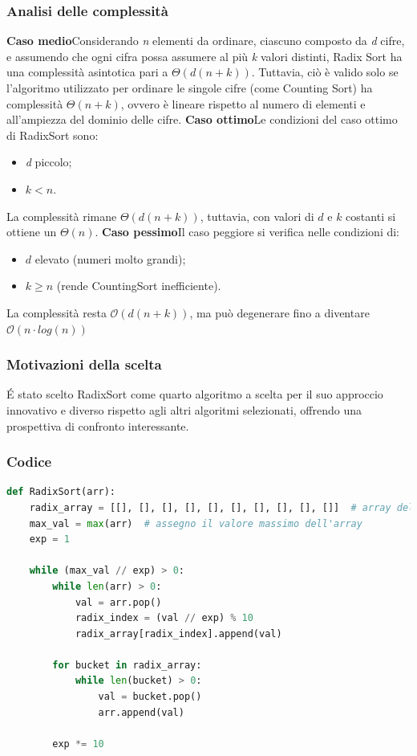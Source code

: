 \documentclass[a4paper, 11pt]{article}
\begin{document}
\subsubsection{Analisi delle complessità}
\textbf{Caso medio}\quad Considerando \textit{n} elementi da ordinare, ciascuno composto da \textit{d} cifre, e assumendo che ogni cifra possa assumere al più \textit{k} valori distinti, Radix Sort ha una complessità asintotica pari a $\Theta(d(n + k))$.\bigbreak
\noindent Tuttavia, ciò è valido solo se l'algoritmo utilizzato per ordinare le singole cifre (come Counting Sort) ha complessità $\Theta(n + k)$, ovvero è lineare rispetto al numero di elementi e all'ampiezza del dominio delle cifre.\bigbreak
\noindent \textbf{Caso ottimo}\quad Le condizioni del caso ottimo di RadixSort sono:
\begin{itemize}
    \item \textit{d} piccolo;
    \item $k < n$.
\end{itemize}
La complessità rimane $\Theta(d(n + k))$, tuttavia, con valori di $d$ e $k$ costanti si ottiene un $\Theta(n)$.\bigbreak
\noindent \textbf{Caso pessimo}\quad Il caso peggiore si verifica nelle condizioni di:
\begin{itemize}
    \item $d$ elevato (numeri molto grandi);
    \item $k \geq n$ (rende CountingSort inefficiente).
\end{itemize}
La complessità resta $\mathcal{O}(d(n + k))$, ma può degenerare fino a diventare $\mathcal{O}(n\cdot log(n))$
\subsubsection{Motivazioni della scelta}
É stato scelto RadixSort come quarto algoritmo a scelta per il suo approccio innovativo e diverso rispetto agli altri algoritmi selezionati, offrendo una prospettiva di confronto interessante.

\subsubsection{Codice}
\begin{lstlisting}[style=mycodestyle, language=Python]
def RadixSort(arr):
    radix_array = [[], [], [], [], [], [], [], [], [], []]  # array delle cifre
    max_val = max(arr)  # assegno il valore massimo dell'array
    exp = 1 

    while (max_val // exp) > 0:
        while len(arr) > 0:
            val = arr.pop()
            radix_index = (val // exp) % 10
            radix_array[radix_index].append(val)

        for bucket in radix_array:
            while len(bucket) > 0:
                val = bucket.pop()
                arr.append(val)

        exp *= 10
\end{lstlisting}
\end{document}

